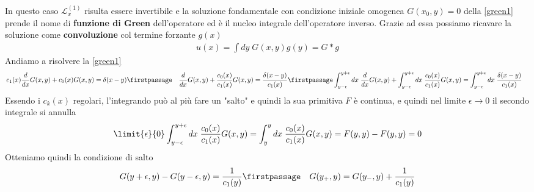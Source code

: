 In questo caso $\mathcal{L}^{(1)}_x$ risulta essere invertibile e la soluzione fondamentale con condizione iniziale omogenea $G(x_0,y) = 0$ della \ref{green1} prende il nome di \textbf{funzione di Green} dell'operatore ed è il nucleo integrale dell'operatore inverso. Grazie ad essa possiamo ricavare la soluzione come \textbf{convoluzione} col termine forzante $g(x)$
\begin{align}
	u(x) = \int dy \; G(x,y) g(y) = G * g
\end{align}
Andiamo a risolvere la \ref{green1}
\begin{align}
	&c_1 (x) \frac{d}{dx}G(x,y) + c_0(x) G(x,y)  = \delta(x-y) \firstpassage
	&\frac{d}{dx}G(x,y) + \frac{c_0(x)}{c_1(x)} G(x,y)  = \frac{\delta(x-y)}{c_1(x)}\firstpassage
	&\int_{y-\epsilon}^{y+\epsilon} dx \;\frac{d}{dx}G(x,y) + \int_{y-\epsilon}^{y+\epsilon} dx \;\frac{c_0(x)}{c_1(x)} G(x,y)  = \int_{y-\epsilon}^{y+\epsilon} dx \;\frac{\delta(x-y)}{c_1(x)}
\end{align}
Essendo i $c_k(x)$ regolari, l'integrando può al più fare un "salto" e quindi la sua primitiva $F$ è continua, e quindi nel limite $\epsilon \to 0$ il secondo integrale si annulla
\begin{align}
	\limit{\epsilon}{0}\int_{y-\epsilon}^{y+\epsilon} dx \;\frac{c_0(x)}{c_1(x)} G(x,y)  = \int_{y}^{y} dx \;\frac{c_0(x)}{c_1(x)} G(x,y) = F(y,y) - F(y,y) = 0
\end{align}
Otteniamo quindi la condizione di salto
\begin{align}
	&G(y+\epsilon,y) - G(y-\epsilon,y) = \frac{1}{c_1(y)}\firstpassage
	&G(y_+,y) = G(y_-,y) + \frac{1}{c_1(y)}
\end{align}

